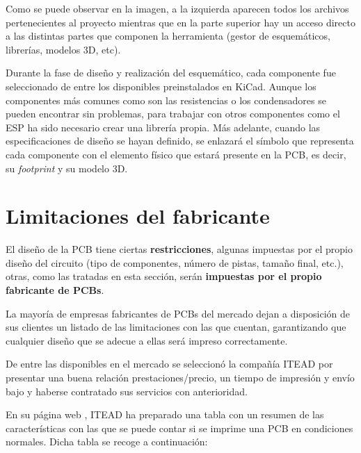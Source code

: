 Como se puede observar en la imagen, a la izquierda aparecen todos los archivos pertenecientes al proyecto mientras que en la parte superior hay un acceso directo a las distintas partes que componen la herramienta (gestor de esquemáticos, librerías, modelos 3D, etc).

Durante la fase de diseño y realización del esquemático, cada componente fue seleccionado de entre los disponibles preinstalados en KiCad. Aunque los componentes más comunes como son las resistencias o los condensadores se pueden encontrar sin problemas, para trabajar con otros componentes como el ESP ha sido necesario crear una librería propia. Más adelante, cuando las especificaciones de diseño se hayan definido, se enlazará el símbolo que representa cada componente con el elemento físico que estará presente en la \acrshort{PCB}, es decir, su \textit{footprint} y su modelo 3D.

\section{Limitaciones del fabricante\label{sec:ITEAD_PCB}}

El diseño de la \acrshort{PCB} tiene ciertas \textbf{restricciones}, algunas impuestas por el propio diseño del circuito (tipo de componentes, número de pistas, tamaño final, etc.), otras, como las tratadas en esta sección, serán \textbf{impuestas por el propio fabricante de \acrshort{PCB}s}.

La mayoría de empresas fabricantes de PCBs del mercado dejan a disposición de sus clientes un listado de las limitaciones con las que cuentan, garantizando que cualquier diseño que se adecue a ellas será impreso correctamente. 

De entre las disponibles en el mercado se seleccionó la compañía ITEAD por presentar una buena relación prestaciones/precio, un tiempo de impresión y envío bajo y haberse contratado sus servicios con anterioridad.

En su página web \cite{ITEAD_PCB_Limitations}, ITEAD ha preparado una tabla con un resumen de las características con las que se puede contar si se imprime una \acrshort{PCB} en condiciones normales. Dicha tabla se recoge a continuación:

